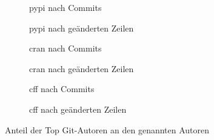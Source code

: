 \begin{figure}[H]
    \begin{subfigure}{.5\textwidth}
        \centering
        
        \caption{\gls{pypi} nach Commits}
        \label{fig:common_authors_pypi}
    \end{subfigure}%
    \begin{subfigure}{.5\textwidth}
        \centering
        
        \caption{\gls{pypi} nach geänderten Zeilen}
        \label{fig:common_authors_by_lines_pypi}
    \end{subfigure}
    \begin{subfigure}{.5\textwidth}
        \centering
        
        \caption{\gls{cran} nach Commits}
        \label{fig:common_authors_cran}
    \end{subfigure}%
    \begin{subfigure}{.5\textwidth}
        \centering
        
        \caption{\gls{cran} nach geänderten Zeilen}
        \label{fig:common_authors_by_lines_cran}
    \end{subfigure}
    \begin{subfigure}{.5\textwidth}
        \centering
        
        \caption{\gls{cff} nach Commits}
        \label{fig:common_authors_cff}
    \end{subfigure}%
    \begin{subfigure}{.5\textwidth}
        \centering
        
        \caption{\gls{cff} nach geänderten Zeilen}
        \label{fig:common_authors_by_lines_cff}
    \end{subfigure}
    \caption{Anteil der Top Git-Autoren an den genannten Autoren}
    \label{fig:common_authors_anhang}
\end{figure}

